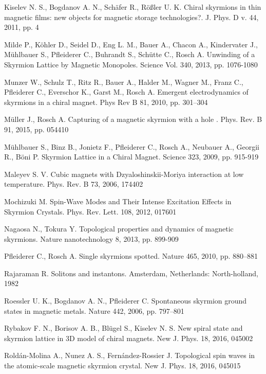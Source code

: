 \documentclass[a4paper,article,14pt]{extarticle}
\begin{document}
\begin{thebibliography}{1}
 Kiselev N. S., Bogdanov  A. N., Schäfer R., Rößler U. K. \flqq Chiral skyrmions in thin magnetic films: new objects for magnetic storage technologies?\frqq. J. Phys. D v. 44, 2011, pp. 4

 Milde P., Köhler D., Seidel D., Eng L. M., Bauer A., Chacon A., Kindervater J., Mühlbauer S.,  Pfleiderer C.,  Buhrandt S., Schütte C., Rosch A. \flqq Unwinding of a Skyrmion Lattice by Magnetic Monopoles\frqq. Science Vol. 340, 2013, pp. 1076-1080

 Munzer W., Schulz T., Ritz R., Bauer A., Halder M., Wagner M., Franz C., Pfleiderer C., Everschor K., Garst M., Rosch A. \flqq Emergent electrodynamics of skyrmions in a chiral magnet\frqq. Phys Rev B 81, 2010, pp. 301–304

 Müller J., Rosch A. \flqq Capturing of a magnetic skyrmion with a hole \frqq. Phys. Rev. B 91, 2015, pp. 054410

 Mühlbauer S., Binz B., Jonietz F., Pfleiderer C., Rosch A., Neubauer A., Georgii R., Böni P. \flqq Skyrmion Lattice in a Chiral Magnet\frqq. Science 323, 2009, pp. 915-919

 Maleyev S. V. \flqq Cubic magnets with Dzyaloshinskii-Moriya interaction at low temperature\frqq. Phys. Rev. B  73, 2006, 174402

 Mochizuki M. \flqq Spin-Wave Modes and Their Intense Excitation Effects in Skyrmion Crystals\frqq.  Phys. Rev. Lett. 108, 2012, 017601

 Nagaosa N., Tokura Y. \flqq Topological properties and dynamics of magnetic skyrmions\frqq. Nature nanotechnology 8, 2013, pp. 899-909

 Pfleiderer C., Rosch A. \flqq Single skyrmions spotted\frqq. Nature 465, 2010, pp. 880–881

 Rajaraman R. \flqq Solitons and instantons\frqq. Amsterdam, Netherlands: North-holland, 1982

 Roessler U. K., Bogdanov A. N., Pfleiderer C. \flqq Spontaneous skyrmion ground
states in magnetic metals\frqq. Nature 442, 2006, pp. 797–801

 Rybakov F. N., Borisov A. B., Blügel S., Kiselev N. S. \flqq New spiral state and skyrmion lattice in 3D model of chiral magnets\frqq. New J. Phys. 18, 2016, 045002

 Roldán-Molina A., Nunez A. S., Fernández-Rossier J. \flqq Topological spin waves in the atomic-scale magnetic skyrmion crystal\frqq. New J. Phys. 18, 2016, 045015


\end{thebibliography}
\end{document}
